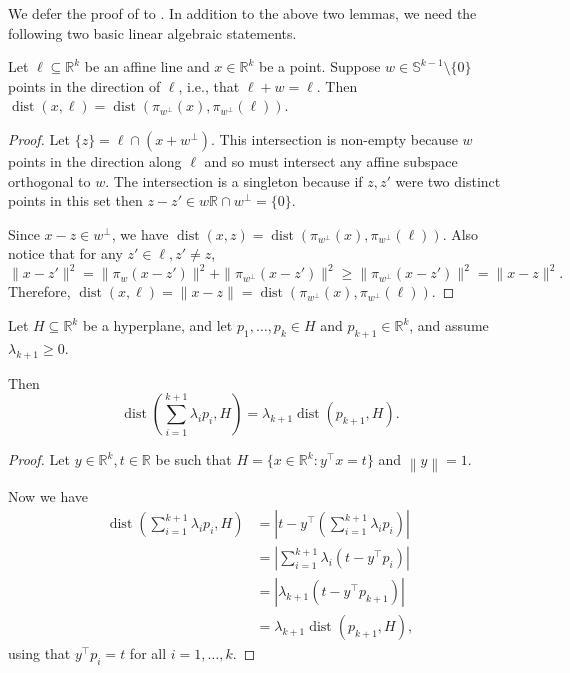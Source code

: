 \documentclass{theoretics}
\newcommand{\R}{\mathbb R}
\newcommand{\T}{\top}
\newcommand{\norm}[1]{\left\|#1 \right\|}
\newcommand{\dist}{\operatorname{dist}}
\renewcommand{\subset}{\subseteq}
\begin{document}
We defer the proof of  to .
In addition to the above two lemmas, we need the following two basic linear algebraic statements.

\begin{fact}\label{lem:proj-dist}
    Let $\ell \subset \R^k$ be an affine line
    and $x \in \R^k$ be a point.
    Suppose $w \in \mathbb{S}^{k-1} \setminus \{0\}$
    points in the direction of $\ell$, i.e.,
    that $\ell + w = \ell$.
    Then $\dist(x, \ell) = \dist(\pi_{w^\perp}(x), \pi_{w^\perp}(\ell))$.
\end{fact}
\begin{proof}
    Let $\{z\} = \ell \cap (x + w^{\perp})$. This intersection is non-empty because
    $w$ points in the direction along $\ell$ and so must intersect any affine subspace orthogonal to $w$.
    The intersection is a singleton because
    if $z, z'$ were two distinct points in this set
    then $z-z' \in w\R \cap w^\perp = \{0\}$.

    Since $x-z \in w^\perp$, we have $\dist(x, z) = \dist(\pi_{w^\perp}(x), \pi_{w^\perp}(\ell))$. Also notice that for any $z' \in \ell, z' \neq z$,
    $$\|x - z'\|^2 = \|\pi_{w}(x - z')\|^2 + \|\pi_{w^\perp}(x - z')\|^2 \geq \|\pi_{w^\perp}(x - z')\|^2 = \|x - z\|^2.$$
    Therefore, $\dist(x, \ell) = \|x - z\| = \dist(\pi_{w^\perp}(x), \pi_{w^\perp}(\ell))$.
%
\end{proof}

\begin{fact}\label{lem:conv-comb-dist}
    Let $H \subset \R^k$ be a hyperplane, and let $p_1,\dots,p_k \in H$
    and $p_{k+1} \in \R^k$,
    and assume $\lambda_{k+1} \geq 0$.

    Then
    \[
    \dist(\sum_{i=1}^{k+1} \lambda_i p_i, H)
    =
    \lambda_{k+1} \dist(p_{k+1}, H).
    \]
\end{fact}
\begin{proof}
    Let $y \in \R^k, t \in \R$ be such that
    $H = \{x \in \R^k : y^\T x = t\}$
    and $\norm{y} = 1$.

    Now we have
    \begin{align*}
        \dist(\sum_{i=1}^{k+1} \lambda_i p_i, H)
        &= |t - y^\T (\sum_{i=1}^{k+1} \lambda_i p_i)| \\
        &= |\sum_{i=1}^{k+1} \lambda_i ( t -  y^\T p_i)| \\
        &= |\lambda_{k+1} ( t -  y^\T p_{k+1})| \\
        &= \lambda_{k+1} \dist( p_{k+1}, H),
    \end{align*}
    using that $y^\T p_i = t$ for all $i = 1,\dots,k$.
\end{proof}
\end{document}
